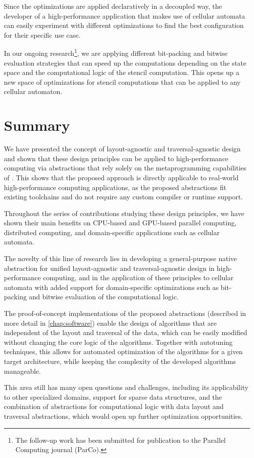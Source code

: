 Since the optimizations are applied declaratively in a decoupled way, the developer of a high-performance application that makes use of cellular automata can easily experiment with different optimizations to find the best configuration for their specific use case.

In our ongoing research\footnote{The follow-up work has been submitted for publication to the Parallel Computing journal (ParCo).}, we are applying different bit-packing and bitwise evaluation strategies that can speed up the computations depending on the state space and the computational logic of the stencil computation. This opens up a new space of optimizations for stencil computations that can be applied to any cellular automaton.


\section{Summary}\label{sec:abstractions-summary}

We have presented the concept of layout-agnostic and traversal-agnostic design and shown that these design principles can be applied to high-performance computing via abstractions that rely solely on the metaprogramming capabilities of \cpp. This shows that the proposed approach is directly applicable to real-world high-performance computing applications, as the proposed abstractions fit existing \cpp toolchains and do not require any custom compiler or runtime support.

Throughout the series of contributions studying these design principles, we have shown their main benefits on CPU-based and GPU-based parallel computing, distributed computing, and domain-specific applications such as cellular automata.

The novelty of this line of research lies in developing a general-purpose native abstraction for unified layout-agnostic and traversal-agnostic design in high-performance computing, and in the application of these principles to cellular automata with added support for domain-specific optimizations such as bit-packing and bitwise evaluation of the computational logic.

The proof-of-concept implementations of the proposed abstractions (described in more detail in \cref{chap:software}) enable the design of algorithms that are independent of the layout and traversal of the data, which can be easily modified without changing the core logic of the algorithms. Together with autotuning techniques, this allows for automated optimization of the algorithms for a given target architecture, while keeping the complexity of the developed algorithms manageable.

This area still has many open questions and challenges, including its applicability to other specialized domains, support for sparse data structures, and the combination of abstractions for computational logic with data layout and traversal abstractions, which would open up further optimization opportunities.
